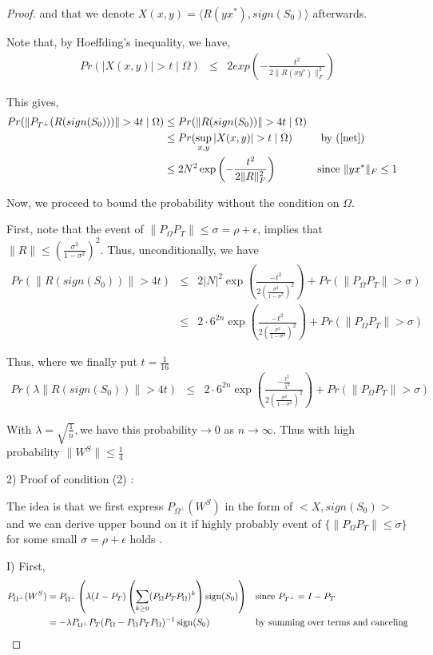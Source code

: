 \begin{proof}
and that we denote $X(x,y)= \langle R(yx^{*}),sign(S_{0}) \rangle$ afterwards.

Note that, by Hoeffding's inequality, we have,
\begin{eqnarray*}
Pr(|X(x,y)|>t\mid\Omega) & \le & 2exp(-\frac{t^{2}}{2\|R(xy^{*})\|_{F}^{2}})
\end{eqnarray*}


This gives,
\begin{align*}
Pr(\|P_{T^{\bot}}(R(sign(S_{0})))\| > 4t\mid\Omega) 
& \le Pr(\|R(sign(S_{0}))\| > 4t\mid\Omega)\\
& \le Pr(\sup_{x,y}|X(x,y)|>t\mid\Omega) 
&& \text{ by (\ref{net})}\\
& \le 2N^{2}\exp \left( -\frac{t^{2}}{2\|R\|_{F}^{2}} \right)
&& \text{since } \|yx^{*}\|_{F} \le 1
\end{align*}


Now, we proceed to bound the probability without the condition on $\Omega$.

First, note that the event of $\|P_{\Omega}P_{T}\|\le\sigma=\rho+\epsilon$, implies that $\|R\|\le(\frac{\sigma^{2}}{1-\sigma^{2}})^{2}$. Thus, unconditionally, we have
\begin{eqnarray*}
Pr(\|R(sign(S_{0}))\|>4t) & \le & 2|N|^{2} \exp \left( \frac{-t^{2}}{2(\frac{\sigma^{2}}{1-\sigma^{2}})^{2}} \right) + Pr(\|P_{\Omega}P_{T}\|>\sigma)\\
 & \le & 2\cdot6^{2n} \exp \left( \frac{-t^{2}}{2(\frac{\sigma^{2}}{1-\sigma^{2}})^{2}} \right) + Pr(\|P_{\Omega}P_{T}\|>\sigma)
\end{eqnarray*}


Thus, where we finally put $t=\frac{1}{16}$
\begin{eqnarray*}
Pr(\lambda\|R(sign(S_{0}))\|>4t) & \le & 2\cdot6^{2n} \exp \left( \frac{-\frac{t^{2}}{\lambda^{2}}}{2(\frac{\sigma^{2}}{1-\sigma^{2}})^{2}} \right) + Pr(\|P_{\Omega}P_{T}\| > \sigma)
\end{eqnarray*}


With $\lambda=\sqrt{\frac{1}{n}},$we have this probability$\to0$ as $n\to\infty$. Thus with high probability $\|W^{S}\|\le\frac{1}{4}$

2) Proof of condition (2) :

The idea is that we first express $P_{\Omega^{\bot}}(W^{S})$ in the form of $<X,sign(S_{0})>$and we can derive upper bound on it if highly probably event of $\{\|P_{\Omega}P_{T}\|\le\sigma\}$ for some small $\sigma=\rho+\epsilon$ holds .

I) First,
\begin{align}
P_{\Omega^{\bot}}(W^{S}) 
& = P_{\Omega^{\bot}} \left( \lambda(I-P_{T}) \left( \sum_{k\ge0}(P_{\Omega}P_{T}P_{\Omega})^{k} \right) \operatorname{sign}(S_{0}) \right) 
&& \text{since } P_{T^{\bot}} = I- P_T\\
& = -\lambda P_{\Omega^{\bot}} P_{T}(P_{\Omega}-P_{\Omega}P_{T}P_{\Omega})^{-1} \operatorname{sign}(S_{0}) 
&&\text{by  summing over terms and canceling} 
\label{wsp1}
\end{align}



\end{proof}
